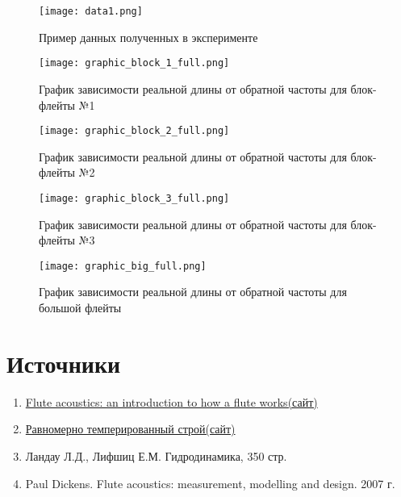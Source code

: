 \newpage
\begin{figure}[!p]
    \centering
    \texttt{[image: data1.png]}
    \caption{Пример данных полученных в эксперименте}
    \label{fig:primer_dannih}
\end{figure}

\newpage
\begin{figure}[!p]
    \centering
    \texttt{[image: graphic\_block\_1\_full.png]}
    \caption{График зависимости реальной длины от обратной частоты для блок-флейты №1}
    \label{fig:graphic_block_1_real}
\end{figure}

\newpage
\begin{figure}[!p]
    \centering
    \texttt{[image: graphic\_block\_2\_full.png]}
    \caption{График зависимости реальной длины от обратной частоты для блок-флейты №2}
    \label{fig:graphic_block_2_real}
\end{figure}

\newpage
\begin{figure}[!p]
    \centering
    \texttt{[image: graphic\_block\_3\_full.png]}
    \caption{График зависимости реальной длины от обратной частоты для блок-флейты №3}
    \label{fig:graphic_block_3_real}
\end{figure}

\newpage
\begin{figure}[!p]
    \centering
    \texttt{[image: graphic\_big\_full.png]}
    \caption{График зависимости реальной длины от обратной частоты для большой флейты}
    \label{fig:graphic_big_real}
\end{figure}
\newpage
\newpage
\section{Источники}

\begin{enumerate}
    \item \href{https://newt.phys.unsw.edu.au/jw/fluteacoustics.html}{Flute acoustics: an introduction to how a flute works(сайт)}
    \item \href{https://ru.wikipedia.org/wiki/Равномерно_темперированный_строй}{Равномерно темперированный строй(сайт)}
    \item Ландау Л.Д., Лифшиц Е.М. Гидродинамика, 350 стр.
    \item Paul Dickens. Flute acoustics: measurement, modelling and design. 2007 г.
\end{enumerate}